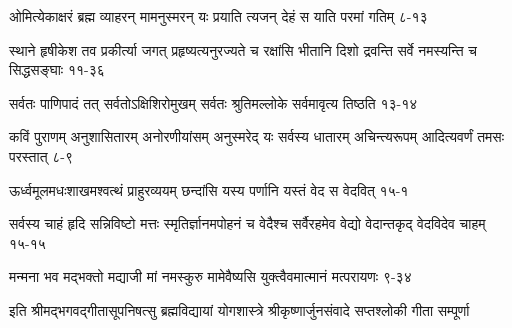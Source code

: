 

\annotwolineshloka
{ओमित्येकाक्षरं ब्रह्म व्याहरन् मामनुस्मरन्}
{यः प्रयाति त्यजन् देहं स याति परमां गतिम्}
{८-१३}

\annofourlineindentedshloka
{स्थाने हृषीकेश तव प्रकीर्त्या}
{जगत् प्रहृष्यत्यनुरज्यते च}
{रक्षांसि भीतानि दिशो द्रवन्ति}
{सर्वे नमस्यन्ति च सिद्धसङ्घाः}
{११-३६}

\annotwolineshloka
{सर्वतः पाणिपादं तत् सर्वतोऽक्षिशिरोमुखम्}
{सर्वतः श्रुतिमल्लोके सर्वमावृत्य तिष्ठति}
{१३-१४}

\annofourlineindentedshloka
{कविं पुराणम् अनुशासितारम्}
{अनोरणीयांसम् अनुस्मरेद् यः}
{सर्वस्य धातारम् अचिन्त्यरूपम्}
{आदित्यवर्णं तमसः परस्तात्}
{८-९}

\annotwolineshloka
{ऊर्ध्वमूलमधःशाखमश्वत्थं प्राहुरव्ययम्}
{छन्दांसि यस्य पर्णानि यस्तं वेद स वेदवित्}
{१५-१}

\annofourlineindentedshloka
{सर्वस्य चाहं हृदि सन्निविष्टो}
{मत्तः स्मृतिर्ज्ञानमपोहनं च}
{वेदैश्च सर्वैरहमेव वेद्यो}
{वेदान्तकृद् वेदविदेव चाहम्}
{१५-१५}

\annotwolineshloka
{मन्मना भव मद्भक्तो मद्याजी मां नमस्कुरु}
{मामेवैष्यसि युक्त्वैवमात्मानं मत्परायणः}
{९-३४}

{इति श्रीमद्भगवद्गीतासूपनिषत्सु ब्रह्मविद्यायां योगशास्त्रे श्रीकृष्णार्जुनसंवादे सप्तश्लोकी गीता सम्पूर्णा}
